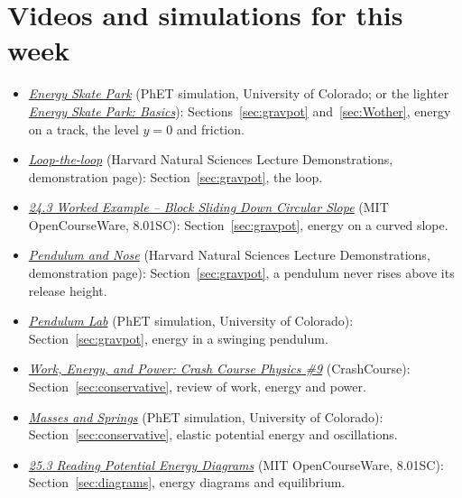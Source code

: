 \documentclass[11pt,a4paper]{article}
\begin{document}
\section*{Videos and simulations for this week}
\begin{itemize}[nosep]
\item \href{https://phet.colorado.edu/en/simulations/energy-skate-park}{\emph{Energy Skate Park}}
  (PhET simulation, University of Colorado; or the lighter
  \href{https://phet.colorado.edu/en/simulations/energy-skate-park-basics}{\emph{Energy Skate Park:
  Basics}}): Sections~\ref{sec:gravpot} and~\ref{sec:Wother}, energy on a track, the level $y = 0$
  and friction.
\item \href{https://sciencedemonstrations.fas.harvard.edu/presentations/loop-loop}{\emph{Loop-the-loop}}
  (Harvard Natural Sciences Lecture Demonstrations, demonstration page): Section~\ref{sec:gravpot},
  the loop.
\item \href{https://ocw.mit.edu/courses/8-01sc-classical-mechanics-fall-2016/resources/24-2/}{\emph{24.3
  Worked Example -- Block Sliding Down Circular Slope}} (MIT OpenCourseWare, 8.01SC):
  Section~\ref{sec:gravpot}, energy on a curved slope.
\item \href{https://sciencedemonstrations.fas.harvard.edu/presentations/pendulum-and-nose}{\emph{Pendulum
  and Nose}} (Harvard Natural Sciences Lecture Demonstrations, demonstration page):
  Section~\ref{sec:gravpot}, a pendulum never rises above its release height.
\item \href{https://phet.colorado.edu/en/simulations/pendulum-lab}{\emph{Pendulum Lab}} (PhET
  simulation, University of Colorado): Section~\ref{sec:gravpot}, energy in a swinging pendulum.
\item \href{https://www.youtube.com/watch?v=w4QFJb9a8vo}{\emph{Work, Energy, and Power: Crash Course
  Physics \#9}} (CrashCourse): Section~\ref{sec:conservative}, review of work, energy and power.
\item \href{https://phet.colorado.edu/en/simulations/masses-and-springs}{\emph{Masses and Springs}}
  (PhET simulation, University of Colorado): Section~\ref{sec:conservative}, elastic potential energy
  and oscillations.
\item \href{https://ocw.mit.edu/courses/8-01sc-classical-mechanics-fall-2016/pages/week-8-potential-energy-and-energy-conservation/25-3-reading-potential-energy-diagrams/}{\emph{25.3
  Reading Potential Energy Diagrams}} (MIT OpenCourseWare, 8.01SC): Section~\ref{sec:diagrams},
  energy diagrams and equilibrium.

\end{itemize}
\end{document}
